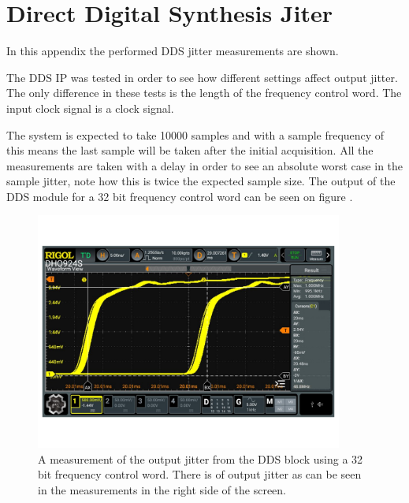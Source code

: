 \chapter{Direct Digital Synthesis Jiter} \label{App:DDSJitter}
In this appendix the performed DDS jitter measurements are shown.

The DDS IP was tested in order to see how different settings affect output jitter. The only difference in these tests is the length of the frequency control word. The input clock signal is a  clock signal.

The system is expected to take 10000 samples and with a sample frequency of  this means the last sample will be taken  after the initial acquisition. All the measurements are taken with a  delay in order to see an absolute worst case in the sample jitter, note how this is twice the expected sample size. The output of the DDS module for a 32 bit frequency control word can be seen on figure .

\begin{figure}[H]
    \centering
    \includegraphics[clip, trim=0 50 0 0, width=0.9\textwidth]{Appendix/Figures/A_DDS_JITTER_32BIT.pdf}
    \caption{A measurement of the output jitter from the DDS block using a 32 bit frequency control word. There is  of output jitter as can be seen in the measurements in the right side of the screen.}
    \label{fig:A_DDS_JITTER_32BIT}
\end{figure}

